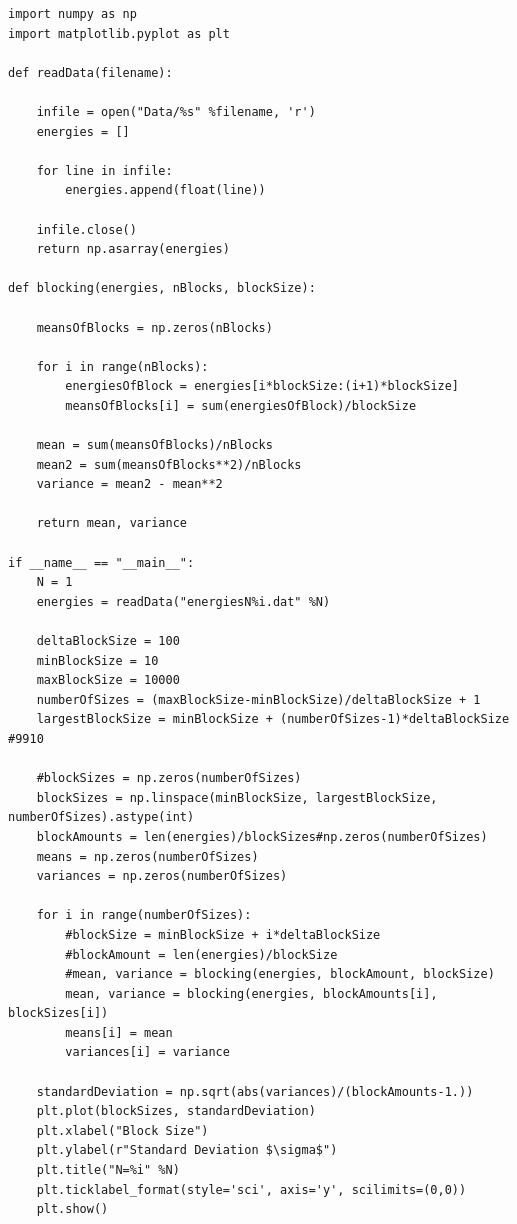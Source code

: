 \documentclass[../main.tex]{subfiles}
\begin{document}
\lstset{language=Python}
\begin{lstlisting}[title={Blocking in Python}]
import numpy as np
import matplotlib.pyplot as plt

def readData(filename):
    
    infile = open("Data/%s" %filename, 'r')
    energies = []
    
    for line in infile:
        energies.append(float(line))
    
    infile.close()
    return np.asarray(energies)
    
def blocking(energies, nBlocks, blockSize):
    
    meansOfBlocks = np.zeros(nBlocks)
    
    for i in range(nBlocks):
        energiesOfBlock = energies[i*blockSize:(i+1)*blockSize]
        meansOfBlocks[i] = sum(energiesOfBlock)/blockSize
    
    mean = sum(meansOfBlocks)/nBlocks
    mean2 = sum(meansOfBlocks**2)/nBlocks
    variance = mean2 - mean**2
    
    return mean, variance
    
if __name__ == "__main__":
    N = 1
    energies = readData("energiesN%i.dat" %N)
    
    deltaBlockSize = 100
    minBlockSize = 10
    maxBlockSize = 10000
    numberOfSizes = (maxBlockSize-minBlockSize)/deltaBlockSize + 1
    largestBlockSize = minBlockSize + (numberOfSizes-1)*deltaBlockSize #9910
    
    #blockSizes = np.zeros(numberOfSizes)
    blockSizes = np.linspace(minBlockSize, largestBlockSize, numberOfSizes).astype(int)
    blockAmounts = len(energies)/blockSizes#np.zeros(numberOfSizes)
    means = np.zeros(numberOfSizes)
    variances = np.zeros(numberOfSizes)
    
    for i in range(numberOfSizes):
        #blockSize = minBlockSize + i*deltaBlockSize
        #blockAmount = len(energies)/blockSize
        #mean, variance = blocking(energies, blockAmount, blockSize)
        mean, variance = blocking(energies, blockAmounts[i], blockSizes[i])
        means[i] = mean
        variances[i] = variance
    
    standardDeviation = np.sqrt(abs(variances)/(blockAmounts-1.))
    plt.plot(blockSizes, standardDeviation)
    plt.xlabel("Block Size")
    plt.ylabel(r"Standard Deviation $\sigma$")
    plt.title("N=%i" %N)
    plt.ticklabel_format(style='sci', axis='y', scilimits=(0,0))
    plt.show()
\end{lstlisting}
\end{document}

